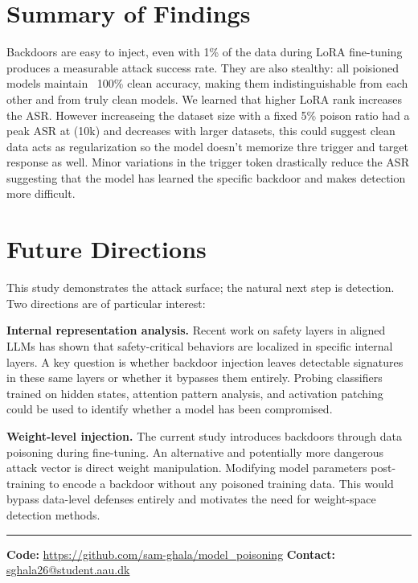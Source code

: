 \documentclass[11pt,a4paper]{article}
\begin{document}
\section{Summary of Findings}
Backdoors are easy to inject, even with 1\% of the data during LoRA fine-tuning produces a measurable attack success rate. They are also stealthy: all poisioned models maintain ~100\% clean accuracy, making them indistinguishable from each other and from truly clean models. We learned that higher LoRA rank increases the ASR. However increaseing the dataset size with a fixed 5\% poison ratio had a peak ASR at (10k) and decreases with larger datasets, this could suggest clean data acts as regularization so the model doesn't memorize thre trigger and target response as well. Minor variations in the trigger token drastically reduce the ASR suggesting that the model has learned the specific backdoor and makes detection more difficult. 

\section{Future Directions}

This study demonstrates the attack surface; the natural next step is detection. Two directions are of particular interest:

\textbf{Internal representation analysis.} Recent work on safety layers in aligned LLMs has shown that safety-critical behaviors are localized in specific internal layers. A key question is whether backdoor injection leaves detectable signatures in these same layers or whether it bypasses them entirely. Probing classifiers trained on hidden states, attention pattern analysis, and activation patching could be used to identify whether a model has been compromised.

\textbf{Weight-level injection.} The current study introduces backdoors through data poisoning during fine-tuning. An alternative and potentially more dangerous attack vector is direct weight manipulation. Modifying model parameters post-training to encode a backdoor without any poisoned training data. This would bypass data-level defenses entirely and motivates the need for weight-space detection methods.

\vspace{1em}
\noindent\rule{\textwidth}{0.4pt}
\vspace{0.3em}
\small
\noindent\textbf{Code:} \url{https://github.com/sam-ghala/model_poisoning} \hfill \textbf{Contact:} \url{sghala26@student.aau.dk}
\end{document}
